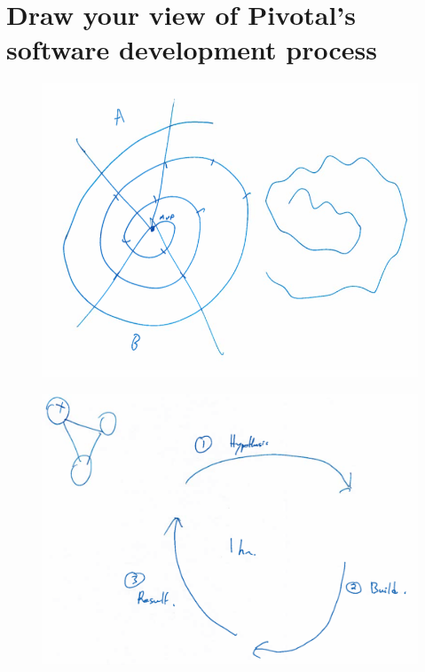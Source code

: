 \section{Draw your view of Pivotal's software development process }

\begin{figure}[H]
\centering
\includegraphics[width=6.5in]{interviews/drawings/2015_06_02.png}
\caption{}
\end{figure}

\begin{figure}[H]
\centering
\includegraphics[width=6.5in]{interviews/drawings/2015_06_29a.png}
\caption{}
\end{figure}

